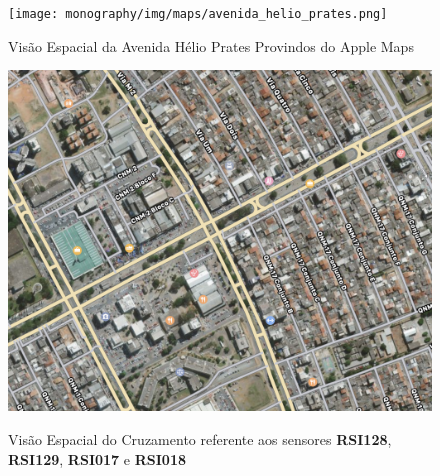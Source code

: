 \begin{figure}[htbp]
    \centering
    \texttt{[image: monography/img/maps/avenida\_helio\_prates.png]}
    \label{figure:helio}
    \caption[Visão Espacial da Avenida Hélio Prates Provindos do Apple Maps]{Visão Espacial da Avenida Hélio Prates Provindos do Apple Maps}
\end{figure}

\begin{figure}[htpb]
    \centering
    \includegraphics[scale=0.6]{monography/img/maps/cruzamento_1.png}
    \label{figure:helio_cruzamento_1}
    \caption[Visão Espacial do Cruzamento referente aos sensores \textbf{RSI128}, \textbf{RSI129}, \textbf{RSI017} e \textbf{RSI018}]{Visão Espacial do Cruzamento referente aos sensores \textbf{RSI128}, \textbf{RSI129}, \textbf{RSI017} e \textbf{RSI018}}
\end{figure}

